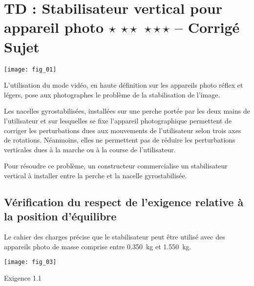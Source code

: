 \chapter*{TD  :
Stabilisateur vertical pour appareil photo \ifnormal $\star$ \else \fi \ifdifficile $\star\star$ \else \fi \iftdifficile $\star\star\star$ \else \fi
 -- \ifprof Corrigé \else Sujet \fi}

\iflivret {} \else
\ifprof  {} \else \fi
\fi

\setcounter{question}{0}

\begin{marginfigure}
\texttt{[image: fig\_01]}
\end{marginfigure}

L’utilisation du mode vidéo, en haute définition sur les appareils photo réflex et légers, pose aux photographes le problème de la stabilisation de l’image. 
 
Les nacelles gyrostabilisées, installées sur une perche portée par les
 deux mains de l’utilisateur et sur lesquelles se fixe l’appareil photographique permettent de corriger les perturbations dues aux mouvements de l’utilisateur selon trois axes de rotations. Néanmoins, elles ne permettent pas de réduire les perturbations verticales dues à la marche ou à la course de l’utilisateur.

Pour résoudre ce problème, un constructeur commercialise un stabilisateur vertical à installer entre la perche et la nacelle gyrostabilisée.

\section*{Vérification du respect de l'exigence relative à la position d'équilibre }
Le cahier des charges précise que le stabilisateur peut être utilisé avec des appareils photo de masse comprise entre \SI{0,350}{kg} et \SI{1,550}{kg}.
\begin{marginfigure}
\centering
\texttt{[image: fig\_03]}
\caption{Exigence 1.1}
\end{marginfigure}

